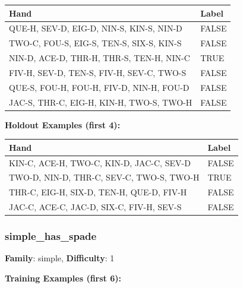 \documentclass[10pt,a4paper]{article}
\begin{document}
\begin{small}
\begin{tabular}{p{8cm}l}
\toprule
Hand & Label \\
\midrule
QUE-H, SEV-D, EIG-D, NIN-S, KIN-S, NIN-D & \textcolor{negative}{FALSE} \\
TWO-C, FOU-S, EIG-S, TEN-S, SIX-S, KIN-S & \textcolor{negative}{FALSE} \\
NIN-D, ACE-D, THR-H, THR-S, TEN-H, NIN-C & \textcolor{positive}{TRUE} \\
FIV-H, SEV-D, TEN-S, FIV-H, SEV-C, TWO-S & \textcolor{negative}{FALSE} \\
QUE-S, FOU-H, FOU-H, FIV-D, NIN-H, FOU-D & \textcolor{negative}{FALSE} \\
JAC-S, THR-C, EIG-H, KIN-H, TWO-S, TWO-H & \textcolor{negative}{FALSE} \\
\bottomrule
\end{tabular}
\end{small}

\textbf{Holdout Examples (first 4):}

\begin{small}
\begin{tabular}{p{8cm}l}
\toprule
Hand & Label \\
\midrule
KIN-C, ACE-H, TWO-C, KIN-D, JAC-C, SEV-D & \textcolor{negative}{FALSE} \\
TWO-D, NIN-D, THR-C, SEV-C, TWO-S, TWO-H & \textcolor{positive}{TRUE} \\
THR-C, EIG-H, SIX-D, TEN-H, QUE-D, FIV-H & \textcolor{negative}{FALSE} \\
JAC-C, ACE-C, JAC-D, SIX-C, FIV-H, SEV-S & \textcolor{negative}{FALSE} \\
\bottomrule
\end{tabular}
\end{small}

\vspace{0.5cm}

\subsubsection{simple\_has\_spade}

\textbf{Family}: simple, \textbf{Difficulty}: 1

\textbf{Training Examples (first 6):}
\end{document}
